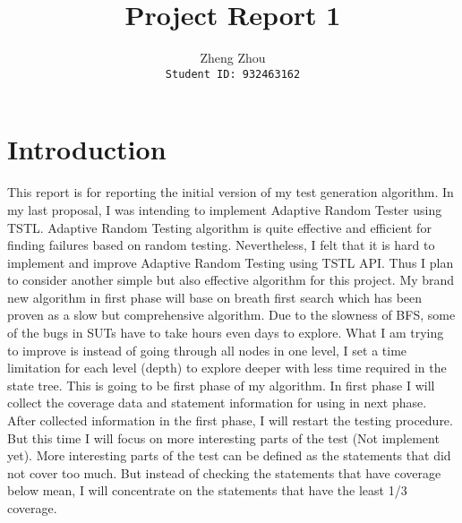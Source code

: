 \documentclass[11pt]{article}
\theoremstyle{plain}
\theoremstyle{definition}
\begin{document}
\title{Project Report 1}
\author{Zheng Zhou \\ \texttt{Student ID: 932463162}}

\maketitle

\section{Introduction}
This report is for reporting the initial version of my test generation algorithm. In my last proposal, I was intending to implement Adaptive Random Tester using TSTL. Adaptive Random Testing algorithm is quite effective and efficient for finding failures based on random testing. Nevertheless, I felt that it is hard to implement and improve Adaptive Random Testing using TSTL API. Thus I plan to consider another simple but also effective algorithm for this project. My brand new algorithm in first phase will base on breath first search which has been proven as a slow but comprehensive algorithm. Due to the slowness of BFS, some of the bugs in SUTs have to take hours even days to explore. What I am trying to improve is instead of going through all nodes in one level, I set a time limitation for each level (depth) to explore deeper with less time required in the state tree. This is going to be first phase of my algorithm. In first phase I will collect the coverage data and statement information for using in next phase. After collected information in the first phase, I will restart the testing procedure. But this time I will focus on more interesting parts of the test (Not implement yet). More interesting parts of the test can be defined as the statements that did not cover too much. But instead of checking the statements that have coverage below mean, I will concentrate on the statements that have the least 1/3 coverage.
\end{document}
